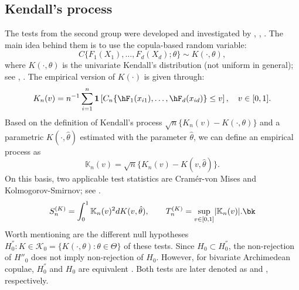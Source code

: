 \subsection{Kendall's process}\label{subsec:gof_Kendall}
The tests from the second group were developed and investigated by \citet{genest_rivest_1993}, \citet{wang_wells_2000}, \citet{genest_quessy_remillard_2006}. 
\mycolor The main idea behind them is to use the copula-based random variable:
\begin{equation}
	C\{F_1(X_1), \ldots, F_d(X_d);\theta\}\sim K(\cdot, \theta),
\end{equation}
where $K(\cdot, \theta)$ is the univariate Kendall's distribution (not uniform in general); see \citet{barbe_genest_ghoudi_remillard_1996}, \citet{jouini_clemen_1996}. The empirical version of  $K(\cdot)$ is given through:
\begin{align*}
	K_n (v) = n^{-1}\sum_{i=1}^{n} \mathbf{1}\left[C_n\{\hF_1(x_{i1}), \ldots, \hF_d(x_{id})\} \leq v\right], \quad v \in [0,1].
\end{align*}
Based on the definition of Kendall's process $\sqrt{n} \{K_n(v) - K(\cdot, \theta)\}$ and a parametric $K(\cdot, \hat\theta)$ estimated with the parameter $\hat\theta$, we can define an empirical process as
\begin{equation}\label{eq:empKendalls_process}
	\mathbb{K}_n(v) = \sqrt{n} \{K_n(v) - K(v, \hat\theta)\}.
\end{equation}
On this basis, two applicable test statistics are Cram\'{e}r-von Mises and Kolmogorov-Smirnov; see \citet{genest_quessy_remillard_2006}.
\begin{equation*}
	S_n^{(K)} = \int_{0}^{1} \mathbb{K}_n(v)^2 d K(v, \hat\theta),\qquad
	T_n^{(K)} = \underset{v \in [0,1]}{\sup} |\mathbb{K}_n(v)|.\bk
\end{equation*}
Worth mentioning are the different null hypotheses $H_0^{''}: K \in \mathcal{K}_0 = \{K(\cdot, \theta): \theta \in \Theta\}$ of these tests. Since $H_0 \subset H_0^{''}$, the non-rejection of $H''_0$ does not imply non-rejection of $H_0$. However, for bivariate Archimedean copulae, $H_0^{''}$ and $H_0$ are equivalent \mycolor \citep{genest_remillard_beaudoin_2009}\bk. Both tests are later denoted as  and , respectively. 

